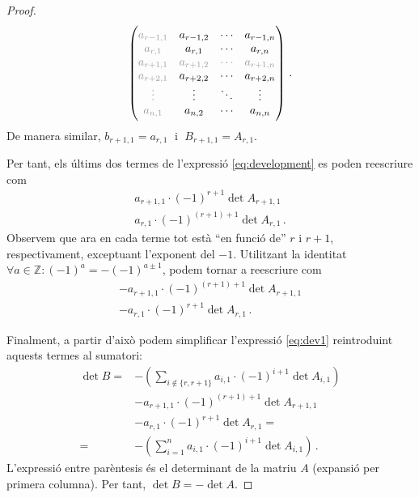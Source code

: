 \begin{s-lema}
\begin{proof}
\begin{alignat*}{2}
\begin{pmatrix}
		\color[gray]{0.6}
		a_{r-1,1} &	a_{r-1,2} &	\cdots &	a_{r-1,n} \\
		\color[gray]{0.6}
		a_{r,1} &	a_{r,1} &	\cdots &	a_{r,n} \\
		\color[gray]{0.6}	a_{r+1,1} &	\color[gray]{0.6}a_{r+1,2} &\color[gray]{0.6}	\cdots &	\color[gray]{0.6}a_{r+1,n}  \\
		\color[gray]{0.6}
		a_{r+2,1} &	a_{r+2,2} &	\cdots &	a_{r+2,n} \\
		\color[gray]{0.6}
		\vdots &	\vdots &	\ddots &	\vdots \\
		\color[gray]{0.6}
		a_{n,1} &	a_{n,2} &	\cdots &	a_{n,n} \\
		\end{pmatrix}\,.
		\end{alignat*}
		De manera similar, $b_{r+1, 1} = a_{r, 1}\;$ i $\;B_{r+1,1} = A_{r,1}$.
		
		Per tant, els últims dos termes de l'expressió \eqref{eq:development} es poden reescriure com
		\begin{equation*}\label{eq:penult}
		\begin{gathered}
		a_{r+1,1}\cdot(-1)^{r+1}\det A_{r+1,1}\\
		a_{r,1}\cdot(-1)^{(r+1)+1}\det A_{r,1}\,.
		\end{gathered}
		\end{equation*}
		Observem que ara en cada terme tot està ``en funció de'' $r$ i $r+1$, respectivament, exceptuant l'exponent del $-1$. Utilitzant la identitat $\forall a\in\mathbb{Z} : (-1)^a = -(-1)^{a\pm 1}$, podem tornar a reescriure com
		\begin{equation*}\label{eq:last}
		\begin{gathered}
		-a_{r+1,1}\cdot(-1)^{(r+1)+1}\det A_{r+1,1}\\
		-a_{r,1}\cdot(-1)^{r+1}\det A_{r,1}\,.
		\end{gathered}
		\end{equation*}
		
		Finalment, a partir d'això podem simplificar l'expressió \eqref{eq:dev1} reintroduint aquests termes al sumatori:
		\begin{equation}\label{eq:development}
		\begin{split}
		\det B =& 	-\left(\sum_{i\notin \{r, r+1\}} a_{i,1}\cdot(-1)^{i+1}\det A_{i,1}\right)\\
		&	-a_{r+1,1}\cdot(-1)^{(r+1)+1}\det A_{r+1,1}\\
		&	-a_{r,1}\cdot(-1)^{r+1}\det A_{r,1} = \\
		=&-\left(\sum_{i=1}^{n} a_{i,1}\cdot(-1)^{i+1}\det A_{i,1}\right)\,.
		\end{split}
		\end{equation}
		L'expressió entre parèntesis és el determinant de la matriu $A$ (expansió per primera columna). Per tant, $\det B = -\det A$.
	\end{proof}


\end{s-lema}
